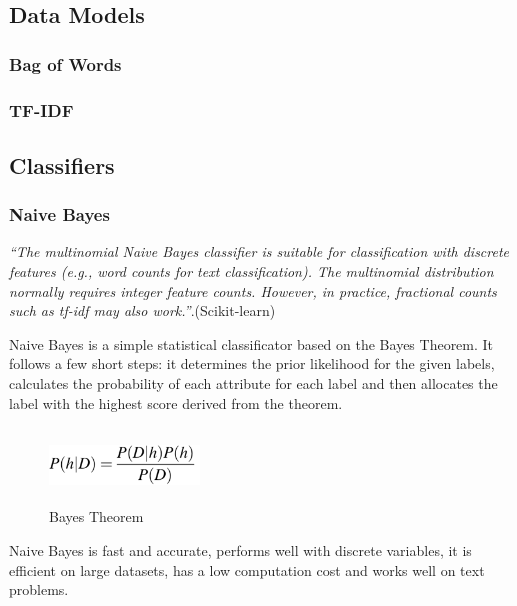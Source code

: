 \documentclass{article}
\begin{document}
	\subsection{Data Models}
	\subsubsection{Bag of Words}
	\subsubsection{TF-IDF}
	
	
	\subsection{Classifiers}
	\subsubsection{Naive Bayes}
	\par \textit{``The multinomial Naive Bayes classifier is suitable for classification with discrete features (e.g., word counts for text classification). The multinomial distribution normally requires integer feature counts. However, in practice, fractional counts such as tf-idf may also work.''}.(Scikit-learn)
	\par Naive Bayes is a simple statistical classificator based on the Bayes Theorem. It follows a few short steps: it determines the prior likelihood for the given labels, calculates the probability of each attribute for each label and then allocates the label with the highest score derived from the theorem. 
	\begin{figure}[!h]
		\centering
		\includegraphics[width=4cm,height=2cm,keepaspectratio]{Pics/NaiveBayes}
		\caption{Bayes Theorem}
	\end{figure}
	\par Naive Bayes is fast and accurate, performs well with discrete variables, it is efficient on large datasets, has a low computation cost and works well on text problems.
\end{document}
